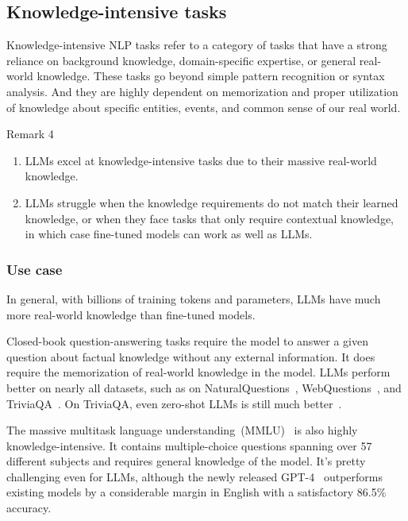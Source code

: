 \documentclass[manuscript,screen, nonacm]{acmart}
\begin{document}
\subsection{Knowledge-intensive tasks}
Knowledge-intensive NLP tasks refer to a category of tasks that have a strong reliance on background knowledge, domain-specific expertise, or general real-world knowledge. These tasks go beyond simple pattern recognition or syntax analysis. And they are highly dependent on memorization and proper utilization of knowledge about specific entities, events, and common sense of our real world.

\begin{applebox}{Remark 4}
    \begin{enumerate}[leftmargin=0.4cm]
        \item LLMs excel at knowledge-intensive tasks due to their massive real-world knowledge.
        \item LLMs struggle when the knowledge requirements do not match their learned knowledge, or when they face tasks that only require contextual knowledge, in which case fine-tuned models can work as well as LLMs.
    \end{enumerate}
\end{applebox}

\subsubsection{Use case}In general, with billions of training tokens and parameters,  LLMs have much more real-world knowledge than fine-tuned models.  

Closed-book question-answering tasks require the model to answer a given question about factual knowledge without any external information. It does require the memorization of real-world knowledge in the model. LLMs perform better on nearly all datasets, such as on NaturalQuestions~\cite{kwiatkowski2019natural}, WebQuestions~\cite{berant2013semantic}, and TriviaQA~\cite{joshi2017triviaqa}. On TriviaQA, even zero-shot LLMs is still much better~\cite{chowdhery2022palm}. 


The massive multitask language understanding~(MMLU)~\cite{hendrycks2020measuring} is also highly knowledge-intensive. It contains multiple-choice questions spanning over 57 different subjects and requires general knowledge of the model. It's pretty challenging even for LLMs, although the newly released GPT-4~\cite{openai2023gpt4} outperforms existing models by a considerable margin in English with a satisfactory 86.5\% accuracy.
\end{document}
